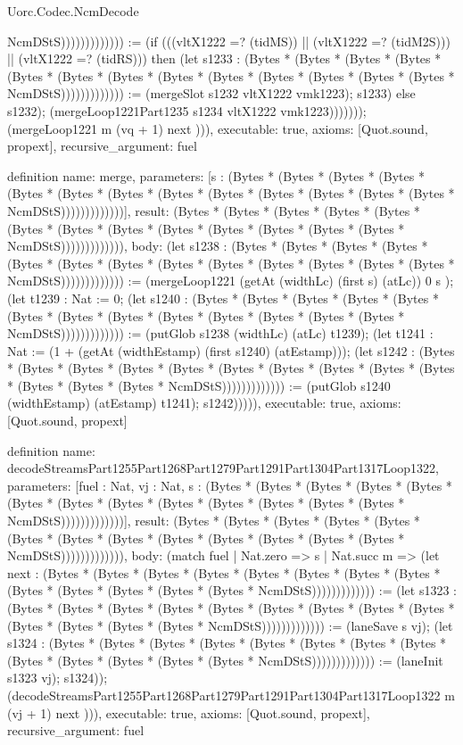 \begin{lexlean}{Uorc.Codec.NcmDecode}
\begin{semanticmodule}
{NcmDStS))))))))))))) := (if (((vltX1222 =? (tidMS)) || (vltX1222 =? (tidM2S))) || (vltX1222 =? (tidRS))) then (let s1233 : (Bytes * (Bytes * (Bytes * (Bytes * (Bytes * (Bytes * (Bytes * (Bytes * (Bytes * (Bytes * (Bytes * (Bytes * (Bytes * NcmDStS))))))))))))) := (mergeSlot s1232 vltX1222 vmk1223); s1233) else s1232); (mergeLoop1221Part1235 s1234 vltX1222 vmk1223))))))); (mergeLoop1221 m (vq + 1) next ))),
  executable: true,
  axioms: [Quot.sound, propext],
  recursive_argument: fuel
}

definition{
  name: merge,
  parameters: [s : (Bytes * (Bytes * (Bytes * (Bytes * (Bytes * (Bytes * (Bytes * (Bytes * (Bytes * (Bytes * (Bytes * (Bytes * (Bytes * NcmDStS)))))))))))))],
  result: (Bytes * (Bytes * (Bytes * (Bytes * (Bytes * (Bytes * (Bytes * (Bytes * (Bytes * (Bytes * (Bytes * (Bytes * (Bytes * NcmDStS))))))))))))),
  body: (let s1238 : (Bytes * (Bytes * (Bytes * (Bytes * (Bytes * (Bytes * (Bytes * (Bytes * (Bytes * (Bytes * (Bytes * (Bytes * (Bytes * NcmDStS))))))))))))) := (mergeLoop1221 (getAt (widthLc) (first s) (atLc)) 0 s ); (let t1239 : Nat := 0; (let s1240 : (Bytes * (Bytes * (Bytes * (Bytes * (Bytes * (Bytes * (Bytes * (Bytes * (Bytes * (Bytes * (Bytes * (Bytes * (Bytes * NcmDStS))))))))))))) := (putGlob s1238 (widthLc) (atLc) t1239); (let t1241 : Nat := (1 + (getAt (widthEstamp) (first s1240) (atEstamp))); (let s1242 : (Bytes * (Bytes * (Bytes * (Bytes * (Bytes * (Bytes * (Bytes * (Bytes * (Bytes * (Bytes * (Bytes * (Bytes * (Bytes * NcmDStS))))))))))))) := (putGlob s1240 (widthEstamp) (atEstamp) t1241); s1242))))),
  executable: true,
  axioms: [Quot.sound, propext]
}

definition{
  name: decodeStreamsPart1255Part1268Part1279Part1291Part1304Part1317Loop1322,
  parameters: [fuel : Nat, vj : Nat, s : (Bytes * (Bytes * (Bytes * (Bytes * (Bytes * (Bytes * (Bytes * (Bytes * (Bytes * (Bytes * (Bytes * (Bytes * (Bytes * NcmDStS)))))))))))))],
  result: (Bytes * (Bytes * (Bytes * (Bytes * (Bytes * (Bytes * (Bytes * (Bytes * (Bytes * (Bytes * (Bytes * (Bytes * (Bytes * NcmDStS))))))))))))),
  body: (match fuel
    | Nat.zero => s
    | Nat.succ m => (let next : (Bytes * (Bytes * (Bytes * (Bytes * (Bytes * (Bytes * (Bytes * (Bytes * (Bytes * (Bytes * (Bytes * (Bytes * (Bytes * NcmDStS))))))))))))) := (let s1323 : (Bytes * (Bytes * (Bytes * (Bytes * (Bytes * (Bytes * (Bytes * (Bytes * (Bytes * (Bytes * (Bytes * (Bytes * (Bytes * NcmDStS))))))))))))) := (laneSave s vj); (let s1324 : (Bytes * (Bytes * (Bytes * (Bytes * (Bytes * (Bytes * (Bytes * (Bytes * (Bytes * (Bytes * (Bytes * (Bytes * (Bytes * NcmDStS))))))))))))) := (laneInit s1323 vj); s1324)); (decodeStreamsPart1255Part1268Part1279Part1291Part1304Part1317Loop1322 m (vj + 1) next ))),
  executable: true,
  axioms: [Quot.sound, propext],
  recursive_argument: fuel
}


\end{semanticmodule}
\end{lexlean}
